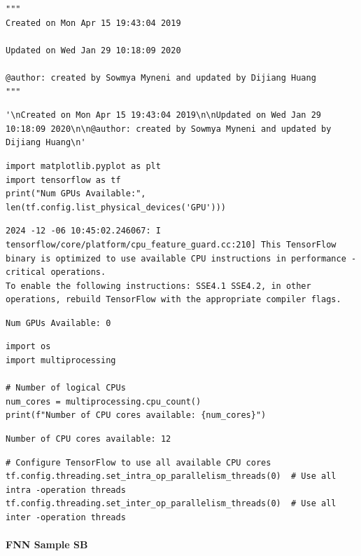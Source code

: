 \begin{verbatim}
"""
Created on Mon Apr 15 19:43:04 2019

Updated on Wed Jan 29 10:18:09 2020

@author: created by Sowmya Myneni and updated by Dijiang Huang
"""
\end{verbatim}

\begin{verbatim}
'\nCreated on Mon Apr 15 19:43:04 2019\n\nUpdated on Wed Jan 29 10:18:09 2020\n\n@author: created by Sowmya Myneni and updated by Dijiang Huang\n'
\end{verbatim}

\begin{verbatim}
import matplotlib.pyplot as plt
import tensorflow as tf
print("Num GPUs Available:", len(tf.config.list_physical_devices('GPU')))
\end{verbatim}

\begin{verbatim}
2024 -12 -06 10:45:02.246067: I tensorflow/core/platform/cpu_feature_guard.cc:210] This TensorFlow binary is optimized to use available CPU instructions in performance -critical operations.
To enable the following instructions: SSE4.1 SSE4.2, in other operations, rebuild TensorFlow with the appropriate compiler flags.
\end{verbatim}

\begin{verbatim}
Num GPUs Available: 0
\end{verbatim}

\begin{verbatim}
import os
import multiprocessing

# Number of logical CPUs
num_cores = multiprocessing.cpu_count()
print(f"Number of CPU cores available: {num_cores}")
\end{verbatim}

\begin{verbatim}
Number of CPU cores available: 12
\end{verbatim}

\begin{verbatim}
# Configure TensorFlow to use all available CPU cores
tf.config.threading.set_intra_op_parallelism_threads(0)  # Use all intra -operation threads
tf.config.threading.set_inter_op_parallelism_threads(0)  # Use all inter -operation threads
\end{verbatim}

\paragraph{FNN Sample SB}


